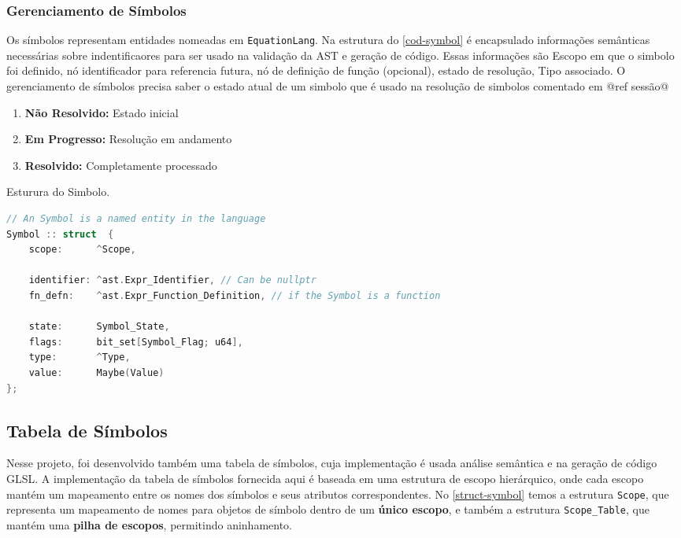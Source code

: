 \subsubsection{Gerenciamento de Símbolos}

Os símbolos representam entidades nomeadas em \texttt{EquationLang}. Na estrutura do \autoref{cod-symbol} é encapsulado informações semânticas necessárias sobre indentificaores para ser usado na validação da AST e geração de código. Essas informações são Escopo em que o simbolo foi definido, nó identificador para referencia futura, nó de definição de função (opcional), estado de resolução, Tipo associado. O gerenciamento de símbolos precisa saber o estado atual de um simbolo que é usado na resolução de simbolos comentado em @ref sessão@

\begin{enumerate}
    \item \textbf{Não Resolvido:} Estado inicial
    \item \textbf{Em Progresso:} Resolução em andamento
    \item \textbf{Resolvido:} Completamente processado
\end{enumerate}

\begin{codigo}[htb]
    \caption{\small Esturura do Simbolo. }
    \label{cod-symbol}
\begin{lstlisting}[language=C, numbers=none, frame=none, inputencoding=latin1]
// An Symbol is a named entity in the language
Symbol :: struct  {
    scope:      ^Scope,

    identifier: ^ast.Expr_Identifier, // Can be nullptr
    fn_defn:    ^ast.Expr_Function_Definition, // if the Symbol is a function

    state:      Symbol_State,
    flags:      bit_set[Symbol_Flag; u64],
    type:       ^Type,
    value:      Maybe(Value)
};

\end{lstlisting}
\end{codigo}


\begin{itemize}
\end{itemize}

\subsection{Tabela de Símbolos}

Nesse projeto, foi desenvolvido também uma tabela de símbolos, cuja implementação é usada análise semântica e na geração de código GLSL. A implementação da tabela de símbolos fornecida aqui é baseada em uma estrutura de escopo hierárquico, onde cada escopo mantém um mapeamento entre os nomes dos símbolos e seus atributos correspondentes. No \autoref{struct-symbol} temos a estrutura \texttt{Scope}, que representa um mapeamento de nomes para objetos de símbolo dentro de um \textbf{único escopo}, e também a estrutura \texttt{Scope\_Table}, que mantém uma \textbf{pilha de escopos}, permitindo aninhamento.


